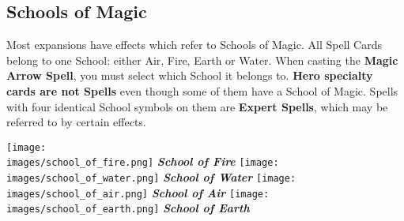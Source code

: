 
\begin{multicols}{2}

\subsection*{Schools of Magic}
Most expansions have effects which refer to Schools of Magic.
All Spell Cards belong to one School: either Air, Fire, Earth or Water.
When casting the \textbf{Magic Arrow Spell}, you must select which School it belongs to.
\textbf{Hero specialty cards are not Spells} even though some of them have a School of Magic.
Spells with four identical School symbols on them are \textbf{Expert Spells}, which may be referred to by certain effects.

\columnbreak

\begin{minipage}[t]{0.48\textwidth}
  \centering
    \centering
    \texttt{[image: \\images/school\_of\_fire.png]}
    \textit{\textbf{\textcolor{darkcandyapplered}{School of Fire}}}
  \endminipage
    \centering
    \texttt{[image: \\images/school\_of\_water.png]}
    \textit{\textbf{\textcolor{darkcandyapplered}{School of Water}}}
  \endminipage
  \hfill\allowbreak%
  \bigbreak
    \centering
    \texttt{[image: \\images/school\_of\_air.png]}
    \textit{\textbf{\textcolor{darkcandyapplered}{School of Air}}}
  \endminipage
    \centering
    \texttt{[image: \\images/school\_of\_earth.png]}
    \textit{\textbf{\textcolor{darkcandyapplered}{School of Earth}}}
  \endminipage
  \bigbreak
\end{minipage}

\end{multicols}

